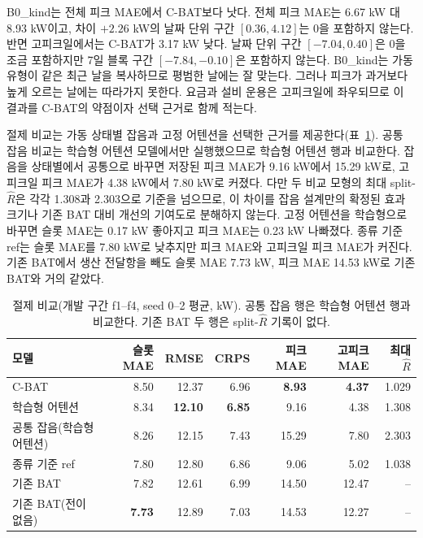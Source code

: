 B0\_kind는 전체 피크 MAE에서 C-BAT보다 낫다. 전체 피크 MAE는 6.67 kW 대 8.93 kW이고, 차이 $+2.26$ kW의 날짜 단위 구간 $[0.36, 4.12]$는 0을 포함하지 않는다. 반면 고피크일에서는 C-BAT가 3.17 kW 낮다. 날짜 단위 구간 $[-7.04, 0.40]$은 0을 조금 포함하지만 7일 블록 구간 $[-7.84, -0.10]$은 포함하지 않는다. B0\_kind는 가동유형이 같은 최근 날을 복사하므로 평범한 날에는 잘 맞는다. 그러나 피크가 과거보다 높게 오르는 날에는 따라가지 못한다. 요금과 설비 운용은 고피크일에 좌우되므로 이 결과를 C-BAT의 약점이자 선택 근거로 함께 적는다.

절제 비교는 가동 상태별 잡음과 고정 어텐션을 선택한 근거를 제공한다(표~\ref{tab:ch4-ablation}). 공통 잡음 비교는 학습형 어텐션 모델에서만 실행했으므로 학습형 어텐션 행과 비교한다. 잡음을 상태별에서 공통으로 바꾸면 저장된 피크 MAE가 9.16 kW에서 15.29 kW로, 고피크일 피크 MAE가 4.38 kW에서 7.80 kW로 커졌다. 다만 두 비교 모형의 최대 split-$\hat R$은 각각 1.308과 2.303으로 기준을 넘으므로, 이 차이를 잡음 설계만의 확정된 효과 크기나 기존 BAT 대비 개선의 기여도로 분해하지 않는다. 고정 어텐션을 학습형으로 바꾸면 슬롯 MAE는 0.17 kW 좋아지고 피크 MAE는 0.23 kW 나빠졌다. 종류 기준 ref는 슬롯 MAE를 7.80 kW로 낮추지만 피크 MAE와 고피크일 피크 MAE가 커진다. 기존 BAT에서 생산 전달항을 빼도 슬롯 MAE 7.73 kW, 피크 MAE 14.53 kW로 기존 BAT와 거의 같았다.

\begin{table}[htbp]
\centering
\caption{절제 비교(개발 구간 f1--f4, seed 0--2 평균, kW). 공통 잡음 행은 학습형 어텐션 행과 비교한다. 기존 BAT 두 행은 split-$\hat R$ 기록이 없다.}
\label{tab:ch4-ablation}
\small
\begin{tabular}{lrrrrrr}
\toprule
모델 & 슬롯 MAE & RMSE & CRPS & 피크 MAE & 고피크 MAE & 최대 $\hat R$ \\
\midrule
C-BAT & 8.50 & 12.37 & 6.96 & \textbf{8.93} & \textbf{4.37} & 1.029 \\
학습형 어텐션 & 8.34 & \textbf{12.10} & \textbf{6.85} & 9.16 & 4.38 & 1.308 \\
공통 잡음(학습형 어텐션) & 8.26 & 12.15 & 7.43 & 15.29 & 7.80 & 2.303 \\
종류 기준 ref & 7.80 & 12.80 & 6.86 & 9.06 & 5.02 & 1.038 \\
기존 BAT & 7.82 & 12.61 & 6.99 & 14.50 & 12.47 & -- \\
기존 BAT(전이 없음) & \textbf{7.73} & 12.89 & 7.03 & 14.53 & 12.27 & -- \\
\bottomrule
\end{tabular}
\end{table}

